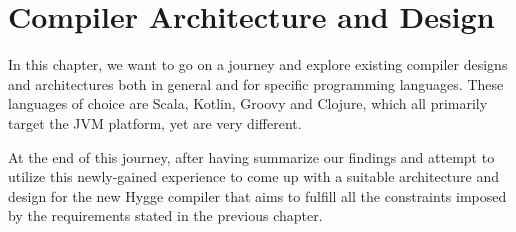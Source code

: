 \chapter{Compiler Architecture and Design}

In this chapter, we want to go on a journey and explore existing compiler designs and architectures both in general and
for specific programming languages. These languages of choice are Scala, Kotlin, Groovy and Clojure, which all primarily target the JVM platform,
yet are very different.

At the end of this journey, after having summarize our findings and attempt to utilize this newly-gained experience to come up with a suitable
architecture and design for the new Hygge compiler that aims to fulfill all the constraints imposed by the requirements stated in the previous chapter.